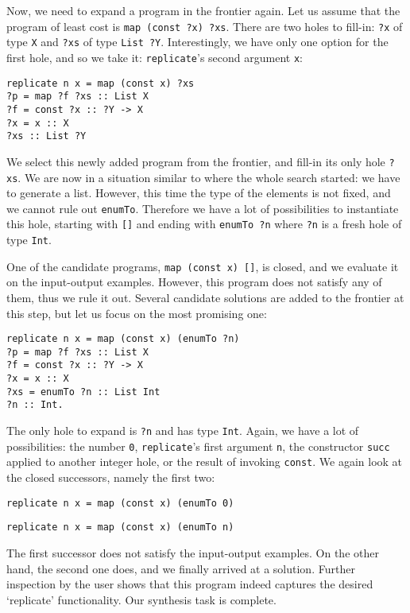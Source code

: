 Now, we need to expand a program in the frontier again.  Let us assume that the program of least cost is \lstinline|map (const ?x) ?xs|.  There are two holes to fill-in: \lstinline|?x| of type \lstinline|X| and \lstinline|?xs| of type \lstinline|List ?Y|.  Interestingly, we have only one option for the first hole, and so we take it: \lstinline|replicate|'s second argument \lstinline|x|:
\begin{lstlisting}[style=plain]
replicate n x = map (const x) ?xs
?p = map ?f ?xs :: List X
?f = const ?x :: ?Y -> X
?x = x :: X
?xs :: List ?Y
\end{lstlisting}

We select this newly added program from the frontier, and fill-in its only hole \lstinline|?xs|.  We are now in a situation similar to where the whole search started: we have to generate a list.  However, this time the type of the elements is not fixed, and we cannot rule out \lstinline|enumTo|.  Therefore we have a lot of possibilities to instantiate this hole, starting with \lstinline|[]| and ending with \lstinline|enumTo ?n| where \lstinline|?n| is a fresh hole of type \lstinline|Int|.

One of the candidate programs, \lstinline|map (const x) []|, is closed, and we evaluate it on the input-output examples.  However, this program does not satisfy any of them, thus we rule it out.  Several candidate solutions are added to the frontier at this step, but let us focus on the most promising one:
\begin{lstlisting}[style=plain]
replicate n x = map (const x) (enumTo ?n)
?p = map ?f ?xs :: List X
?f = const ?x :: ?Y -> X
?x = x :: X
?xs = enumTo ?n :: List Int
?n :: Int.
\end{lstlisting}

The only hole to expand is \lstinline|?n| and has type \lstinline|Int|.  Again, we have a lot of possibilities: the number \lstinline|0|, \lstinline|replicate|'s first argument \lstinline|n|, the constructor \lstinline|succ| applied to another integer hole, or the result of invoking \lstinline|const|.  We again look at the closed successors, namely the first two:
\begin{lstlisting}
replicate n x = map (const x) (enumTo 0)
\end{lstlisting}
\begin{lstlisting}
replicate n x = map (const x) (enumTo n)
\end{lstlisting}
The first successor does not satisfy the input-output examples.  On the other hand, the second one does, and we finally arrived at a solution.  Further inspection by the user shows that this program indeed captures the desired `replicate' functionality.  Our synthesis task is complete.

